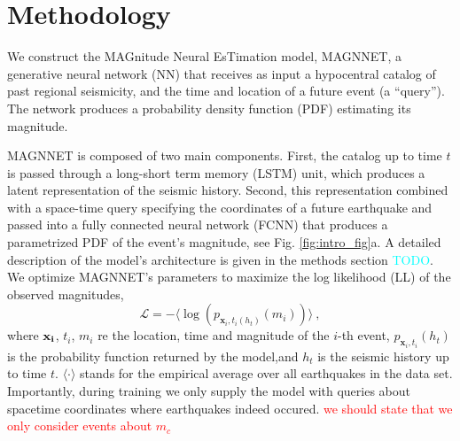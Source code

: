 \documentclass[pdflatex]{sn-jnl}
\newcommand{\yohai}[1]{{\textcolor{red}{#1}}}
\newcommand{\neri}[1]{{\textcolor{cyan}{#1}}}
\begin{document}


\section{Methodology}
We construct the MAGnitude Neural EsTimation model, MAGNNET, a generative neural network (NN) that receives as input a hypocentral catalog of past regional seismicity, and the time and location of a future event (a ``query''). The network produces a probability density function (PDF) estimating its magnitude.


MAGNNET is composed of two main components. First, the catalog up to time $t$ is passed through a long-short term memory (LSTM) unit, which produces a latent representation of the seismic history.
Second, this representation combined with a space-time query specifying the coordinates of a future earthquake and passed into a fully connected neural network (FCNN) that produces a parametrized PDF of the event's magnitude, see Fig. \ref{fig:intro_fig}a. A detailed description of the model's architecture is given in the methods section \neri{TODO}. We optimize MAGNNET's parameters to maximize the log likelihood (LL) of the observed magnitudes,
\begin{equation}
    \mathcal{L} = -\langle \log{ \left( p_{\textbf{x}_i, t_i(h_t)} \left( m_i \right) \right) } \rangle\ ,
    \label{eq:loss_function}
\end{equation}
where $\bf{x}_i$, $t_i$, $m_i$ re the location, time and magnitude of the $i$-th event, $p_{\textbf{x}_i, t_i}(h_t)$ is the probability function returned by the model,and $h_t$ is the seismic history up to time $t$. $\langle \cdot\rangle$ stands for the empirical average over all earthquakes in the data set. Importantly, during training we only supply the model with queries about spacetime coordinates where earthquakes indeed occured. \yohai{we should state that we only consider events about $m_c$}
\end{document}
